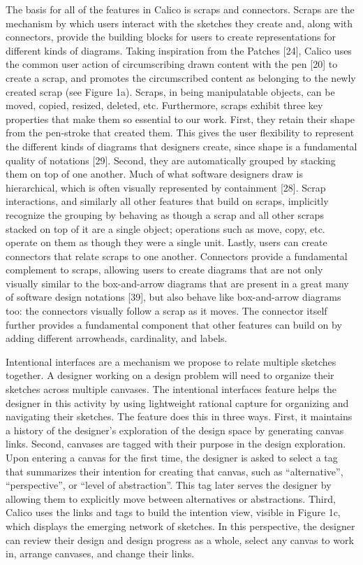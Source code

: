 The basis for all of the features in Calico is scraps and connectors. Scraps are the mechanism by which users interact with the sketches they create and, along with connectors, provide the building blocks for users to create representations for different kinds of diagrams. Taking inspiration from the Patches [24], Calico uses the common user action of circumscribing drawn content with the pen [20] to create a scrap, and promotes the circumscribed content as belonging to the newly created scrap (see Figure 1a). Scraps, in being manipulatable objects, can be moved, copied, resized, deleted, etc. Furthermore, scraps exhibit three key properties that make them so essential to our work. First, they retain their shape from the pen-stroke that created them. This gives the user flexibility to represent the different kinds of diagrams that designers create, since shape is a fundamental quality of notations [29]. Second, they are automatically grouped by stacking them on top of one another. Much of what software designers draw is hierarchical, which is often visually represented by containment [28]. Scrap interactions, and similarly all other features that build on scraps, implicitly recognize the grouping by behaving as though a scrap and all other scraps stacked on top of it are a single object; operations such as move, copy, etc. operate on them as though they were a single unit. Lastly, users can create connectors that relate scraps to one another. Connectors provide a fundamental complement to scraps, allowing users to create diagrams that are not only visually similar to the box-and-arrow diagrams that are present in a great many of software design notations [39], but also behave like box-and-arrow diagrams too: the connectors visually follow a scrap as it moves. The connector itself further provides a fundamental component that other features can build on by adding different arrowheads, cardinality, and labels. 

Intentional interfaces are a mechanism we propose to relate multiple sketches together. A designer working on a design problem will need to organize their sketches across multiple canvases. The intentional interfaces feature helps the designer in this activity by using lightweight rational capture for organizing and navigating their sketches. The feature does this in three ways. First, it maintains a history of the designer’s exploration of the design space by generating canvas links. Second, canvases are tagged with their purpose in the design exploration. Upon entering a canvas for the first time, the designer is asked to select a tag that summarizes their intention for creating that canvas, such as “alternative”, “perspective”, or “level of abstraction”. This tag later serves the designer by allowing them to explicitly move between alternatives or abstractions. Third, Calico uses the links and tags to build the intention view, visible in Figure 1c, which displays the emerging network of sketches. In this perspective, the designer can review their design and design progress as a whole, select any canvas to work in, arrange canvases, and change their links. 

